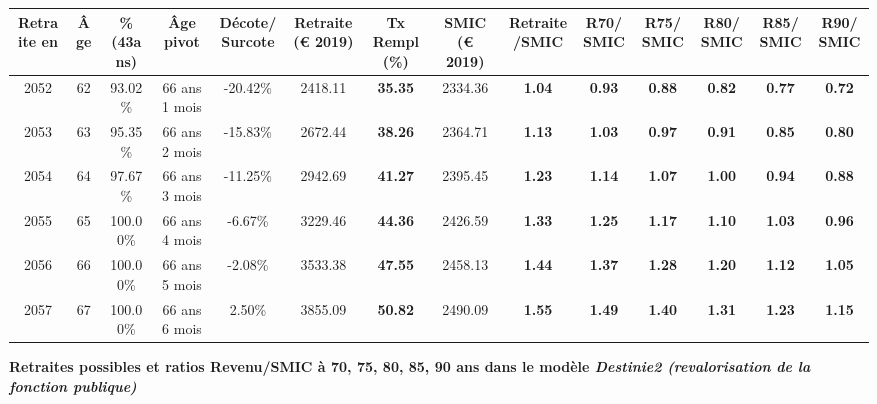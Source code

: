 \begin{adjustbox}{max width=\textwidth} 
\begin{tabular}[htb]{|c|c||c|c|c||c|c||c|c||c|c|c|c|c|} 
\hline 
 Retraite en &  Âge &  \%(43ans) &  Âge pivot &  Décote/Surcote &  Retraite (\euro{} 2019) &  Tx Rempl(\%) &  SMIC (\euro{} 2019) &  Retraite/SMIC &  R70/SMIC &  R75/SMIC &  R80/SMIC &  R85/SMIC &  R90/SMIC \\ 
\hline \hline 
 2052 &  62 &  93.02\% &  66 ans 1 mois &  -20.42\% &  2418.11 &  {\bf 35.35} &  2334.36 &  {\bf 1.04} &  {\bf {\color{red} 0.93}} &  {\bf {\color{red} 0.88}} &  {\bf {\color{red} 0.82}} &  {\bf {\color{red} 0.77}} &  {\bf {\color{red} 0.72}} \\ 
\hline 
 2053 &  63 &  95.35\% &  66 ans 2 mois &  -15.83\% &  2672.44 &  {\bf 38.26} &  2364.71 &  {\bf 1.13} &  {\bf 1.03} &  {\bf {\color{red} 0.97}} &  {\bf {\color{red} 0.91}} &  {\bf {\color{red} 0.85}} &  {\bf {\color{red} 0.80}} \\ 
\hline 
 2054 &  64 &  97.67\% &  66 ans 3 mois &  -11.25\% &  2942.69 &  {\bf 41.27} &  2395.45 &  {\bf 1.23} &  {\bf 1.14} &  {\bf 1.07} &  {\bf {\color{red} 1.00}} &  {\bf {\color{red} 0.94}} &  {\bf {\color{red} 0.88}} \\ 
\hline 
 2055 &  65 &  100.00\% &  66 ans 4 mois &  -6.67\% &  3229.46 &  {\bf 44.36} &  2426.59 &  {\bf 1.33} &  {\bf 1.25} &  {\bf 1.17} &  {\bf 1.10} &  {\bf 1.03} &  {\bf {\color{red} 0.96}} \\ 
\hline 
 2056 &  66 &  100.00\% &  66 ans 5 mois &  -2.08\% &  3533.38 &  {\bf 47.55} &  2458.13 &  {\bf 1.44} &  {\bf 1.37} &  {\bf 1.28} &  {\bf 1.20} &  {\bf 1.12} &  {\bf 1.05} \\ 
\hline 
 2057 &  67 &  100.00\% &  66 ans 6 mois &  2.50\% &  3855.09 &  {\bf 50.82} &  2490.09 &  {\bf 1.55} &  {\bf 1.49} &  {\bf 1.40} &  {\bf 1.31} &  {\bf 1.23} &  {\bf 1.15} \\ 
\hline 
\hline 
\end{tabular} 
\end{adjustbox} 
 
 \vspace{0.1cm} 
{\bf \noindent Retraites possibles et ratios Revenu/SMIC à 70, 75, 80, 85, 90 ans dans le modèle \emph{Destinie2 (revalorisation de la fonction publique)}}  
 
